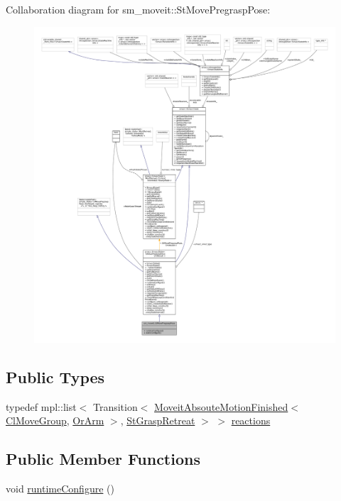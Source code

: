 Collaboration diagram for sm\+\_\+moveit\+:\+:St\+Move\+Pregrasp\+Pose\+:
\nopagebreak
\begin{figure}[H]
\begin{center}
\leavevmode
\includegraphics[width=350pt]{structsm__moveit_1_1StMovePregraspPose__coll__graph}
\end{center}
\end{figure}
\subsection*{Public Types}
\begin{DoxyCompactItemize}
\item 
typedef mpl\+::list$<$ Transition$<$ \hyperlink{structsm__moveit_1_1MoveitAbsouteMotionFinished}{Moveit\+Absoute\+Motion\+Finished}$<$ \hyperlink{classsm__moveit_1_1cl__movegroup_1_1ClMoveGroup}{Cl\+Move\+Group}, \hyperlink{classsm__moveit_1_1OrArm}{Or\+Arm} $>$, \hyperlink{structsm__moveit_1_1StGraspRetreat}{St\+Grasp\+Retreat} $>$ $>$ \hyperlink{structsm__moveit_1_1StMovePregraspPose_ac0b49ce81fdbf86ad8c0fbc35dbd3c41}{reactions}
\end{DoxyCompactItemize}
\subsection*{Public Member Functions}
\begin{DoxyCompactItemize}
\item 
void \hyperlink{structsm__moveit_1_1StMovePregraspPose_acbe7f2c8fb64e1e4b6b8801775e082af}{runtime\+Configure} ()
\end{DoxyCompactItemize}
